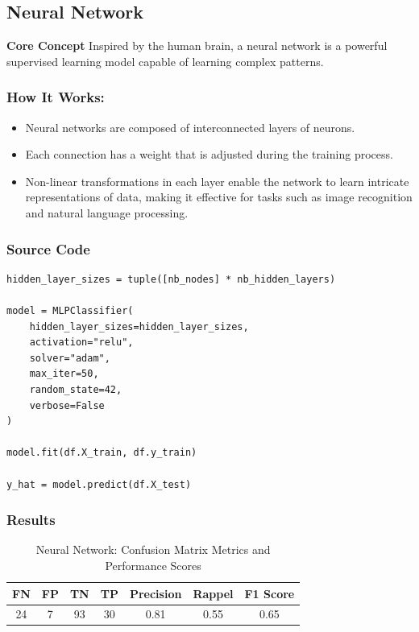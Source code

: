 \documentclass[a4paper,12pt]{article}
\begin{document}
\subsection{Neural Network}
\textbf{Core Concept} Inspired by the human brain, a neural network is a powerful supervised learning model capable of learning complex patterns.
\subsubsection*{How It Works:}
\begin{itemize}
    \item Neural networks are composed of interconnected layers of neurons.
    \item Each connection has a weight that is adjusted during the training process.
    \item Non-linear transformations in each layer enable the network to learn intricate representations of data, making it effective for tasks such as image recognition and natural language processing.
\end{itemize}

\subsubsection*{Source Code}
\begin{lstlisting}[style=python]
hidden_layer_sizes = tuple([nb_nodes] * nb_hidden_layers)

model = MLPClassifier(
    hidden_layer_sizes=hidden_layer_sizes,
    activation="relu",
    solver="adam",
    max_iter=50,
    random_state=42,
    verbose=False
)

model.fit(df.X_train, df.y_train)

y_hat = model.predict(df.X_test)
\end{lstlisting}

\subsubsection*{Results}
\begin{table}[h!]
\centering
\begin{tabular}{|c|c|c|c|c|c|c|}
\hline
\textbf{FN} & \textbf{FP} & \textbf{TN} & \textbf{TP} & \textbf{Precision} & \textbf{Rappel} & \textbf{F1 Score} \\ \hline
24          & 7           & 93          & 30          & 0.81               & 0.55            & 0.65              \\ \hline
\end{tabular}
\caption{Neural Network: Confusion Matrix Metrics and Performance Scores}
\end{table}
\end{document}
